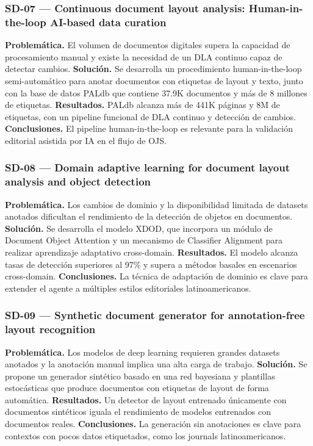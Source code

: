 \subsubsection*{SD-07 --- Continuous document layout analysis: Human-in-the-loop AI-based data curation \cite{ref20}}

\textbf{Problemática.} El volumen de documentos digitales supera la capacidad de procesamiento manual y existe la necesidad de un DLA continuo capaz de detectar cambios. \textbf{Solución.} Se desarrolla un procedimiento human-in-the-loop semi-automático para anotar documentos con etiquetas de layout y texto, junto con la base de datos PALdb que contiene 37.9K documentos y más de 8 millones de etiquetas. \textbf{Resultados.} PALdb alcanza más de 441K páginas y 8M de etiquetas, con un pipeline funcional de DLA continuo y detección de cambios. \textbf{Conclusiones.} El pipeline human-in-the-loop es relevante para la validación editorial asistida por IA en el flujo de OJS.

\subsubsection*{SD-08 --- Domain adaptive learning for document layout analysis and object detection \cite{ref21}}

\textbf{Problemática.} Los cambios de dominio y la disponibilidad limitada de datasets anotados dificultan el rendimiento de la detección de objetos en documentos. \textbf{Solución.} Se desarrolla el modelo XDOD, que incorpora un módulo de Document Object Attention y un mecanismo de Classifier Alignment para realizar aprendizaje adaptativo cross-domain. \textbf{Resultados.} El modelo alcanza tasas de detección superiores al 97\% y supera a métodos basales en escenarios cross-domain. \textbf{Conclusiones.} La técnica de adaptación de dominio es clave para extender el agente a múltiples estilos editoriales latinoamericanos.

\subsubsection*{SD-09 --- Synthetic document generator for annotation-free layout recognition \cite{ref22}}

\textbf{Problemática.} Los modelos de deep learning requieren grandes datasets anotados y la anotación manual implica una alta carga de trabajo. \textbf{Solución.} Se propone un generador sintético basado en una red bayesiana y plantillas estocásticas que produce documentos con etiquetas de layout de forma automática. \textbf{Resultados.} Un detector de layout entrenado únicamente con documentos sintéticos iguala el rendimiento de modelos entrenados con documentos reales. \textbf{Conclusiones.} La generación sin anotaciones es clave para contextos con pocos datos etiquetados, como los journals latinoamericanos.

